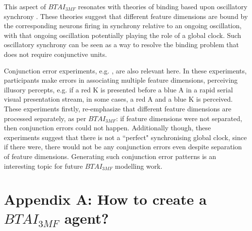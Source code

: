 \documentclass[twoside,11pt]{article}
\begin{document}
This aspect of $BTAI_{3MF}$ resonates with theories of binding based upon oscillatory synchrony \citep{uhlhaas2009neural}. These theories suggest that different feature dimensions are bound by the corresponding neurons firing in synchrony relative to an ongoing oscillation, with that ongoing oscillation potentially playing the role of a global clock. Such oscillatory synchrony can be seen as a way to resolve the binding problem that does not require conjunctive units.

Conjunction error experiments, e.g. \citet{PMID:11766936}, are also relevant here. In these experiments, participants make errors in associating multiple feature dimensions, perceiving illusory percepts, e.g. if a red K is presented before a blue A in a rapid serial visual presentation stream, in some cases, a red A and a blue K is perceived. These experiments firstly, re-emphasize that different feature dimensions are processed separately, as per $BTAI_{3MF}$: if feature dimensions were not separated, then conjunction errors could not happen. Additionally though, these experiments suggest that there is not a ``perfect" synchronising global clock, since if there were, there would not be any conjunction errors even despite separation of feature dimensions. Generating such conjunction error patterns is an interesting topic for future $BTAI_{3MF}$ modelling work.


\vskip 0.2in


\section*{Appendix A: How to create a $BTAI_{3MF}$ agent?}
\end{document}
